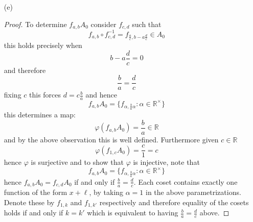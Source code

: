 \documentclass[12pt]{article}
\begin{document}
\begin{enumerate}
\begin{proof}
        The kernel of this action $K$ is in particular a subgroup of $A_0$
        and therefore if $f_{a, b} \in K$ then $b = 0$. Then we must have
        \[ f_{a, b} \cdot 1 = 1 \]
        which means $a \cdot 1 + b = a = 1$ and $K = \{ f_{1, 0}\}$ so this action is faithful.

        However, $A_0$ is not a normal subgroup of $A$. To show this consider $f_{2, 0} \in A_0$
        and $f_{1, 1}$ and $f_{1, 1}^{-1} = f_{1, -1}$. Then we have
        \begin{align*}
            f_{1, 1} \circ f_{2, 0} \circ f_{1, 1}^{-1}(t) &= f_{1, 1} \circ f_{2, 0}(1\cdot t - 1) \\
            &= f_{1, 1}(2t - 2) \\
            &= 1\cdot (2t - 2) + 1 \\
            &= 2t - 1
        \end{align*}
        and this is not an element of $A_0$ hence it is not invariant under conjugation
        by elements in $A$ and thus cannot be normal.
    \end{proof}

    \item[(e)]
    \begin{proof}
        To determine $f_{a, b}A_0$ consider $f_{c, d}$ such that
        \[ f_{a, b} \circ f^{-1}_{c, d} = f_{\frac{a}{c}, b - a\frac{d}{c}} \in A_0 \]
        this holds precisely when
        \[ b - a\frac{d}{c} = 0 \]
        and therefore
        \[ \frac{b}{a} = \frac{d}{c} \]
        fixing $c$ this forces $d = c\frac{b}{a}$
        and hence
        \[ f_{a, b}A_0 = \{ f_{\alpha, \frac{b}{a}\alpha} : \alpha \in \mathbb R^\times \} \]
        this determines a map:
        \[ \varphi(f_{a, b}A_0) = \frac{b}{a} \in \mathbb R \]
        and by the above observation this is well defined.
        Furthermore given $c \in \mathbb R$
        \[ \varphi(f_{1, c}A_0) = \frac{c}{1} = c \]
        hence $\varphi$ is surjective and to show that $\varphi$ is injective,
        note that
        \[ f_{a, b}A_0 = \{ f_{\alpha, \frac{b}{a}\alpha} : \alpha \in \mathbb R^\times \} \]
        hence $f_{a, b}A_0 = f_{c, d}A_0$ if and only if $\frac{b}{a} = \frac{d}{c}$. Each coset
        contains exactly one function of the form $x + \ell$, by taking $\alpha = 1$ in the above parametrizations.
        Denote these by $f_{1, k}$ and $f_{1, k'}$ respectively
        and therefore equality of the cosets holds
        if and only if $k = k'$ which is equivalent to having $\frac{b}{a} = \frac{d}{c}$ above.


\end{proof}
\end{enumerate}
\end{document}
